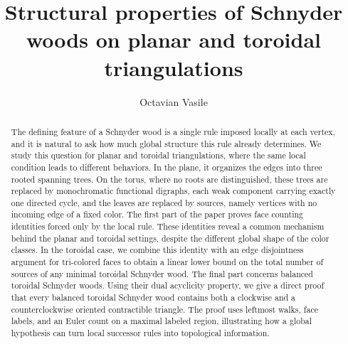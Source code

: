 \documentclass[11pt]{amsart}
\theoremstyle{plain}
\theoremstyle{definition}
\theoremstyle{remark}
\begin{document}
\title[Schnyder woods on planar and toroidal triangulations]%
      {Structural properties of Schnyder woods on planar and toroidal triangulations}

\author{Octavian Vasile}


\date{}

\begin{abstract}
The defining feature of a Schnyder wood is a single rule imposed locally at each vertex, and it is natural to ask how much global structure this rule already determines. We study this question for planar and toroidal triangulations, where the same local condition leads to different behaviors. In the plane, it organizes the edges into three rooted spanning trees. On the torus, where no roots are distinguished, these trees are replaced by monochromatic functional digraphs, each weak component carrying exactly one directed cycle, and the leaves are replaced by sources, namely vertices with no incoming edge of a fixed color.
The first part of the paper proves face counting identities forced only by the local rule. These identities reveal a common mechanism behind the planar and toroidal settings, despite the different global shape of the color classes. In the toroidal case, we combine this identity with an edge disjointness argument for tri-colored faces to obtain a linear lower bound on the total number of sources of any minimal toroidal Schnyder wood.
The final part concerns balanced toroidal Schnyder woods. Using their dual acyclicity property, we give a direct proof that every balanced toroidal Schnyder wood contains both a clockwise and a counterclockwise oriented contractible triangle. The proof uses leftmost walks, face labels, and an Euler count on a maximal labeled region, illustrating how a global hypothesis can turn local successor rules into topological information.





\end{abstract}

\maketitle

\setcounter{tocdepth}{1}
\begingroup
\hypersetup{linkcolor=black}
\tableofcontents
\endgroup
\end{document}
